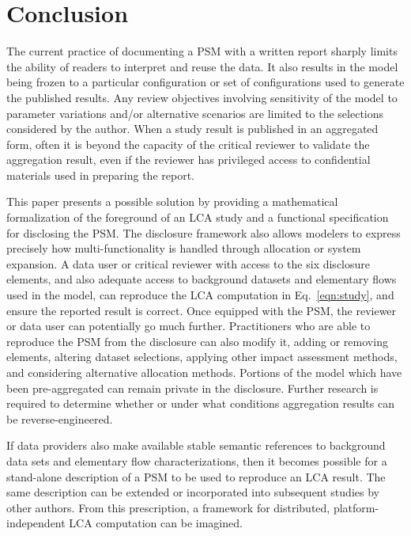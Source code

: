 \section{Conclusion} 

The current practice of documenting a PSM with a written report sharply limits the ability of readers to interpret and reuse the data.  It also results in the model being frozen to a particular configuration or set of configurations used to generate the published results.  Any review objectives involving sensitivity of the model to parameter variations and/or alternative scenarios are limited to the selections considered by the author.
When a study result is published in an aggregated form, often it is beyond the capacity of the critical reviewer to validate the aggregation result, even if the reviewer has privileged access to confidential materials used in preparing the report. 

This paper presents a possible solution by providing a mathematical formalization of the foreground of an LCA study and a functional specification for disclosing the PSM.  The disclosure framework also allows modelers to express precisely how multi-functionality is handled through allocation or system expansion.  A data user or critical reviewer with access to the six disclosure elements, and also adequate access to background datasets and elementary flows used in the model, can reproduce the LCA computation in Eq.~\ref{eqn:study}, and ensure the reported result is correct.  Once equipped with the PSM, the reviewer or data user can potentially go much further.  Practitioners who are able to reproduce the PSM from the disclosure can also modify it, adding or removing elements, altering dataset selections, applying other impact assessment methods, and considering alternative allocation methods. Portions of the model which have been pre-aggregated can remain private in the disclosure. Further research is required to determine whether or under what conditions aggregation results can be reverse-engineered.

If data providers also make available stable semantic references to background data sets and elementary flow characterizations, then it becomes possible for a stand-alone description of a PSM to be used to reproduce an LCA result.  The same description can be extended or incorporated into subsequent studies by other authors. From this prescription, a framework for distributed, platform-independent LCA computation can be imagined.
